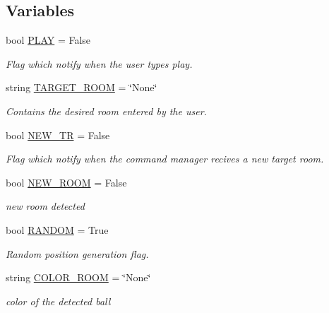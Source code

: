 \subsection*{Variables}
\begin{DoxyCompactItemize}
\item 
bool \hyperlink{namespacecommandManager_aecd980edd677f32e8693cbd21fa2c6eb}{P\+L\+AY} = False
\begin{DoxyCompactList}\small\item\em Flag which notify when the user types \textquotesingle{}play\textquotesingle{}. \end{DoxyCompactList}\item 
string \hyperlink{namespacecommandManager_ace76b1a89b584c851c50bc3ad66e1d69}{T\+A\+R\+G\+E\+T\+\_\+\+R\+O\+OM} = \char`\"{}None\char`\"{}
\begin{DoxyCompactList}\small\item\em Contains the desired room entered by the user. \end{DoxyCompactList}\item 
bool \hyperlink{namespacecommandManager_a6356544112d78464670ffb9af59bed1d}{N\+E\+W\+\_\+\+TR} = False
\begin{DoxyCompactList}\small\item\em Flag which notify when the command manager recives a new target room. \end{DoxyCompactList}\item 
bool \hyperlink{namespacecommandManager_a52e7163bf2cde17330107e6a2cf2f851}{N\+E\+W\+\_\+\+R\+O\+OM} = False
\begin{DoxyCompactList}\small\item\em new room detected \end{DoxyCompactList}\item 
bool \hyperlink{namespacecommandManager_afb1c5b8d9e6c746c82f4abf3fffe02a5}{R\+A\+N\+D\+OM} = True
\begin{DoxyCompactList}\small\item\em Random position generation flag. \end{DoxyCompactList}\item 
string \hyperlink{namespacecommandManager_ae945cfc4fe1632a6952debd7a67d9f3c}{C\+O\+L\+O\+R\+\_\+\+R\+O\+OM} = \char`\"{}None\char`\"{}
\begin{DoxyCompactList}\small\item\em color of the detected ball \end{DoxyCompactList}\item 

\end{DoxyCompactItemize}
